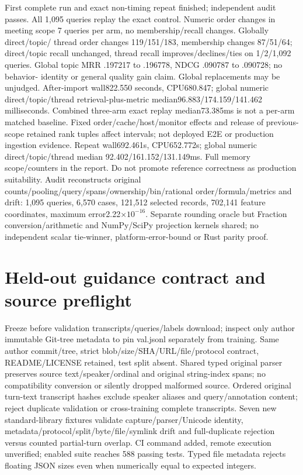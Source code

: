 \documentclass[11pt]{article}
\begin{document}
First complete run and exact non-timing repeat finished; independent audit passes.
All 1,095 queries replay the exact control. Numeric order changes in meeting
scope 7 queries per arm, no membership/recall changes. Globally direct/topic/
thread order changes 119/151/183, membership changes 87/51/64; direct/topic
recall unchanged, thread recall improves/declines/ties on 1/2/1,092 queries.
Global topic MRR .197217 to .196778, NDCG .090787 to .090728; no behavior-
identity or general quality gain claim. Global replacements may be unjudged.
After-import wall822.550 seconds, CPU680.847; global numeric direct/topic/thread
retrieval-plus-metric median96.883/174.159/141.462 milliseconds. Combined
three-arm exact replay median73.385ms is not a per-arm matched baseline.
Fixed order/cache/host/monitor effects and release of previous-scope retained
rank tuples affect intervals; not deployed E2E or production ingestion evidence.
Repeat wall692.461s, CPU652.772s; global numeric direct/topic/thread median
92.402/161.152/131.149ms. Full memory scope/counters in the report. Do not
promote reference correctness as production suitability. Audit reconstructs
original counts/pooling/query/spans/ownership/bin/rational order/formula/metrics
and drift: 1,095 queries, 6,570 cases, 121,512 selected records, 702,141 feature
coordinates, maximum error2.22$\times10^{-16}$. Separate rounding oracle but
Fraction conversion/arithmetic and NumPy/SciPy projection kernels shared;
no independent scalar tie-winner, platform-error-bound or Rust parity proof.

\section{Held-out guidance contract and source preflight}
Freeze before validation transcripts/queries/labels download; inspect only
author immutable Git-tree metadata to pin val.jsonl separately from training.
Same author commit/tree, strict blob/size/SHA/URL/file/protocol contract,
README/LICENSE retained, test split absent. Shared typed original parser
preserves source text/speaker/ordinal and original string-index spans; no
compatibility conversion or silently dropped malformed source. Ordered original
turn-text transcript hashes exclude speaker aliases and query/annotation
content; reject duplicate validation or cross-training complete transcripts.
Seven new standard-library fixtures validate capture/parser/Unicode identity,
metadata/protocol/split/byte/file/symlink drift and full-duplicate rejection
versus counted partial-turn overlap. CI command added, remote execution
unverified; enabled suite reaches 588 passing tests. Typed file metadata rejects
floating JSON sizes even when numerically equal to expected integers.
\end{document}
